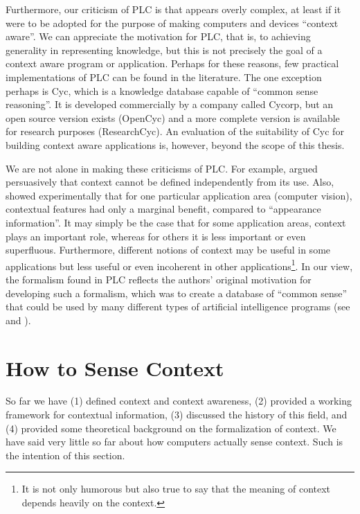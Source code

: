 Furthermore, our criticism of PLC is that appears overly complex, at least if it were to be adopted for the purpose of making computers and devices ``context aware''. We can appreciate the motivation for PLC, that is, to achieving generality in representing knowledge, but this is not precisely the goal of a context aware program or application. Perhaps for these reasons, few practical implementations of PLC can be found in the literature. The one exception perhaps is Cyc, which is a knowledge database capable of ``common sense reasoning''. It is developed commercially by a company called Cycorp, but an open source version exists (OpenCyc) and a more complete version is available for research purposes (ResearchCyc). An evaluation of the suitability of Cyc for building context aware applications is, however, beyond the scope of this thesis.

We are not alone in making these criticisms of PLC. For example, \cite{hirst1997context} argued persuasively that context cannot be defined independently from its use. Also, \cite{wolf2006critical} showed experimentally that for one particular application area (computer vision), contextual features had only a marginal benefit, compared to ``appearance information''. It may simply be the case that for some application areas, context plays an important role, whereas for others it is less important or even superfluous. Furthermore, different notions of context may be useful in some applications but less useful or even incoherent in other applications\footnote{It is not only humorous but also true to say that the meaning of context depends heavily on the context.}. In our view, the formalism found in PLC reflects the authors' original motivation for developing such a formalism, which was to create a database of ``common sense'' that could be used by many different types of artificial intelligence programs (see \cite{mccarthy1969some} and \cite{mccarthy1984some}).

%
%
\section{How to Sense Context}
\label{sec:how}
So far we have (1) defined context and context awareness, (2) provided a working framework for contextual information, (3) discussed the history of this field, and (4) provided some theoretical background on the formalization of context. We have said very little so far about how computers actually sense context. Such is the intention of this section.

